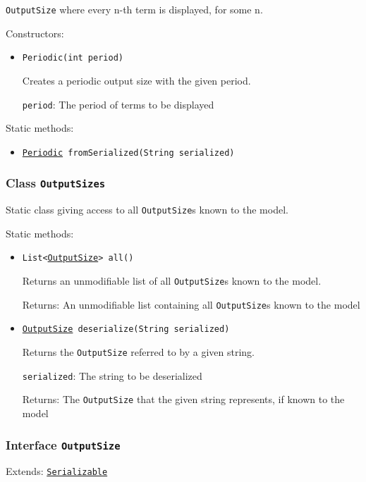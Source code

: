 \texttt{OutputSize} where every n-th term is displayed, for some n.

Constructors:
\begin{itemize}
\item \texttt{Periodic(int period)}

Creates a periodic output size with the given period.

\texttt{period}: The period of terms to be displayed

\end{itemize}

Static methods:
\begin{itemize}
\item \texttt{\hyperref[type:edu.kit.wavelength.client.model.output.Periodic]{Periodic} fromSerialized(String serialized)}



\end{itemize}

\subsubsection{Class \texttt{OutputSizes}}
\label{type:edu.kit.wavelength.client.model.output.OutputSizes}
Static class giving access to all \texttt{OutputSize}s known to the model.

Static methods:
\begin{itemize}
\item \texttt{List<\hyperref[type:edu.kit.wavelength.client.model.output.OutputSize]{OutputSize}> all()}

Returns an unmodifiable list of all \texttt{OutputSize}s known to the model.

Returns: An unmodifiable list containing all \texttt{OutputSize}s known to the
 model

\item \texttt{\hyperref[type:edu.kit.wavelength.client.model.output.OutputSize]{OutputSize} deserialize(String serialized)}

Returns the \texttt{OutputSize} referred to by a given string.

\texttt{serialized}: The string to be deserialized

Returns: The \texttt{OutputSize} that the given string represents, if known to the model

\end{itemize}

\subsubsection{Interface \texttt{OutputSize}}
\label{type:edu.kit.wavelength.client.model.output.OutputSize}
Extends: \texttt{\hyperref[type:edu.kit.wavelength.client.model.serialization.Serializable]{Serializable}}

